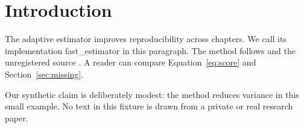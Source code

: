 \section{Introduction}\label{sec:intro}
The adaptive estimator improves reproducibility across chapters.
We call its implementation fast_estimator in this paragraph.
The method follows \cite{known2026} and the unregistered source \cite{missing2026}.
A reader can compare Equation~\eqref{eq:score} and Section~\ref{sec:missing}.

Our synthetic claim is deliberately modest: the method reduces variance in this small example.
No text in this fixture is drawn from a private or real research paper.
